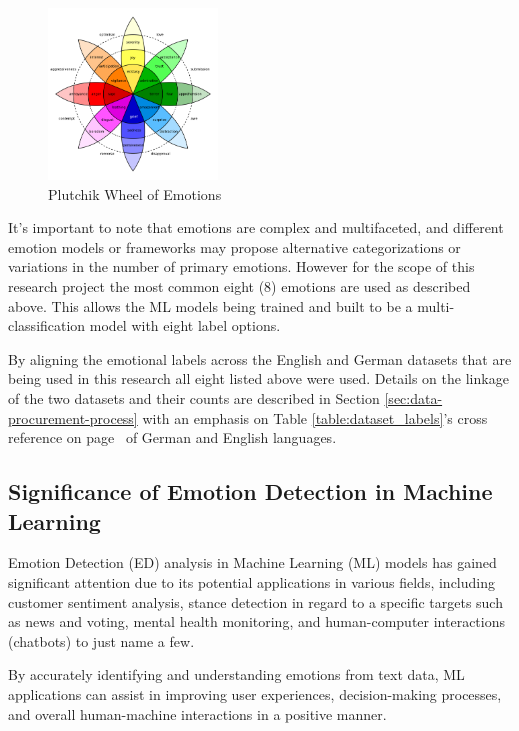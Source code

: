 \documentclass[11pt]{article}
\begin{document}
\begin{figure}[h]
    \centering
    \includegraphics[width=0.4\textwidth]{Plutchik-Wheel}
    \caption{Plutchik Wheel of Emotions}
    \label{fig:plutchik-wheel}
\end{figure}

It's important to note that emotions are complex and multifaceted, and different emotion models or frameworks may propose alternative categorizations or variations in the number of primary emotions. However for the scope of this research project the most common eight (8) emotions are used as described above. This allows the ML models being trained and built to be a multi-classification model with eight label options.

By aligning the emotional labels across the English \cite{english-dataset-twitter} and German \cite{german-dataset-cheese} datasets that are being used in this research all eight listed above were used. Details on the linkage of the two datasets and their counts are described in Section \ref{sec:data-procurement-process} with an emphasis on Table \ref{table:dataset_labels}'s cross reference on page~\pageref{table:dataset_labels} of German and English languages.

\subsection{Significance of Emotion Detection in Machine Learning}
Emotion Detection (ED) analysis in Machine Learning (ML) models has gained significant attention due to its potential applications in various fields, including customer sentiment analysis, stance detection in regard to a specific targets such as news and voting\cite{mascarell-etal-2021-stance}, mental health monitoring\cite{Colonnello}, and human-computer interactions (chatbots\cite{chatbot-cognitive-awareness}) to just name a few.

By accurately identifying and understanding emotions from text data, ML applications can assist in improving user experiences, decision-making processes, and overall human-machine interactions in a positive manner\cite{Colonnello, mascarell-etal-2021-stance}.
\end{document}
